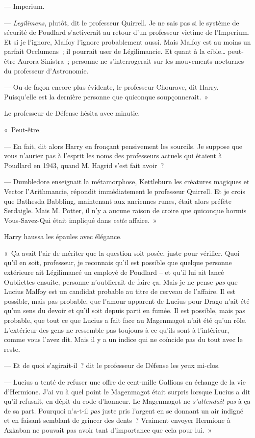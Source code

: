 --- Imperium.

--- \emph{Legilimens}, plutôt, dit le professeur Quirrell. Je ne sais pas si le système de sécurité de Poudlard s'activerait au retour d'un professeur victime de l'Imperium. Et si je l'ignore, Malfoy l'ignore probablement aussi. Mais Malfoy est au moins un parfait Occlumens~; il pourrait user de Légilimancie. Et quant à la cible… peut-être Aurora Sinistra~; personne ne s'interrogerait sur les mouvements nocturnes du professeur d'Astronomie.

--- Ou de façon encore plus évidente, le professeur Chourave, dit Harry. Puisqu'elle est la dernière personne que quiconque soupçonnerait.~»

Le professeur de Défense hésita avec minutie.

«~Peut-être.

--- En fait, dit alors Harry en fronçant pensivement les sourcils. Je suppose que vous n'auriez pas à l'esprit les noms des professeurs actuels qui étaient à Poudlard en 1943, quand M. Hagrid s'est fait avoir~?

--- Dumbledore enseignait la métamorphose, Kettleburn les créatures magiques et Vector l'Arithmancie, répondit immédiatement le professeur Quirrell. Et je crois que Bathesda Babbling, maintenant aux anciennes runes, était alors préfète Serdaigle. Mais M. Potter, il n'y a aucune raison de croire que quiconque hormis Vous-Savez-Qui était impliqué dans \emph{cette} affaire.~»

Harry haussa les épaules avec élégance.

«~Ça avait l'air de mériter que la question soit posée, juste pour vérifier. Quoi qu'il en soit, professeur, je reconnais qu'il est possible que quelque personne extérieure ait Légilimancé un employé de Poudlard -- et qu'il lui ait lancé Oubliettes ensuite, personne n'oublierait de faire ça. Mais je ne pense \emph{pas} que Lucius Malfoy est un candidat probable au titre de cerveau de l'affaire. Il est possible, mais pas probable, que l'amour apparent de Lucius pour Drago n'ait été qu'un sens du devoir et qu'il soit depuis parti en fumée. Il est possible, mais pas probable, que tout ce que Lucius a fait face au Magenmagot n'ait été qu'un rôle. L'extérieur des gens ne ressemble pas toujours à ce qu'ils sont à l'intérieur, comme vous l'avez dit. Mais il y a un indice qui ne coïncide pas du tout avec le reste.

--- Et de quoi s'agirait-il~? dit le professeur de Défense les yeux mi-clos.

--- Lucius a tenté de refuser une offre de cent-mille Gallions en échange de la vie d'Hermione. J'ai vu à quel point le Magenmagot était surpris lorsque Lucius a dit qu'il refusait, en dépit du code d'honneur. Le Magenmagot ne \emph{s'attendait pas} à ça de sa part. Pourquoi n'a-t-il \emph{pas} juste pris l'argent en se donnant un air indigné et en faisant semblant de grincer des dents~? Vraiment envoyer Hermione à Azkaban ne pouvait pas avoir tant d'importance que cela pour lui.~»


